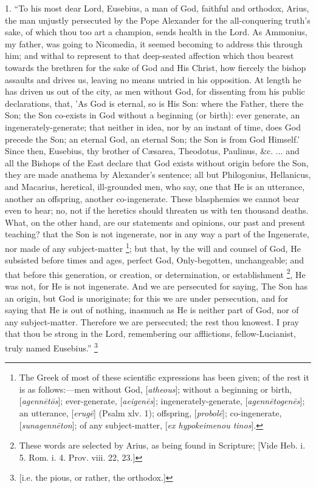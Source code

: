 1. ``To his most dear Lord, Eusebius, a man of God, faithful
and orthodox, Arius, the man unjustly persecuted by the Pope Alexander
for the all-conquering truth's sake, of which thou too art a champion,
sends health in the Lord. As Ammonius, my father, was going to
Nicomedia, it seemed becoming to address this through him; and withal
to represent to that deep-seated affection which thou bearest towards
the brethren for the sake of God and His Christ, how fiercely
the bishop assaults and drives us, leaving no means untried in his
opposition. At length he has driven us out of the city, as men without
God, for dissenting from his public declarations, that, 'As God is
eternal, so is His Son: where the Father, there the Son; the Son
co-exists in God without a beginning (or birth): ever generate, an
ingenerately-generate; that neither in idea, nor by an instant of
time, does God precede the Son; an eternal God, an eternal Son; the
Son is from God Himself.' Since then, Eusebius, thy brother of
Cæsarea, Theodotus, Paulinus, \&c. ... and all the Bishops of the
East declare that God exists without origin before the Son, they are
made anathema by Alexander's sentence; all but Philogonius, Hellanicus,
and Macarius, heretical, ill-grounded men, who say, one that He is an
utterance, another an offspring, another co-ingenerate. These
blasphemies we cannot bear even to hear; no, not if the heretics
should threaten us with ten thousand deaths. What, on the other hand,
are our statements and opinions, our past and present teaching? that
the Son is not ingenerate, nor in any way a part of the Ingenerate,
nor made of any subject-matter \footnote{The Greek of most of these scientific
expressions has been given; of the rest it is as follows:—men
without God, [\emph{atheous}]; without a beginning or birth, [\emph{agenn\={e}t\={o}s}];
ever-generate, [\emph{aeigen\={e}s}]; ingenerately-generate, [\emph{agenn\={e}togen\={e}s}];
an utterance, [\emph{erug\={e}}] (Psalm xlv. 1); offspring, [\emph{probol\={e}}];
co-ingenerate, [\emph{sunagenn\={e}ton}]; of any subject-matter, [\emph{ex
hypokeimenou tinos}].}; but that, by the will and counsel of God, He subsisted before
times and ages, perfect God, Only-begotten, unchangeable; and that
before this generation, or creation, or determination, or
establishment \footnote{These words are selected by Arius, as
being found in Scripture; [Vide Heb. i. 5. Rom. i. 4. Prov. viii. 22,
23.]}, He was
not, for He is not ingenerate. And we are persecuted for saying, The
Son has an origin, but God is unoriginate; for this we are under
persecution, and for saying that He is out of nothing, inasmuch as He
is neither part of God, nor of any subject-matter. Therefore we are
persecuted; the rest thou knowest. I pray that thou be strong in the
Lord, remembering our afflictions, fellow-Lucianist, truly named
Eusebius.'' \footnote{[i.e. the pious, or rather, the orthodox.]}

